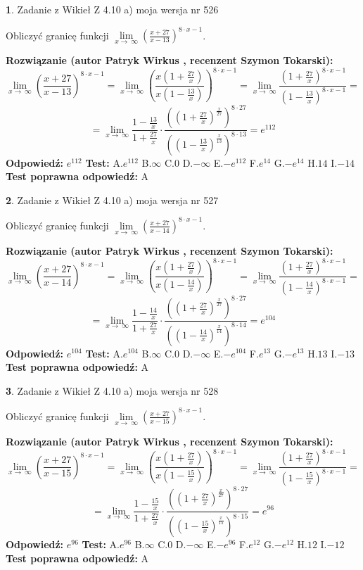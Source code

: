 \documentclass[12pt, a4paper]{article}
\theoremstyle{definition} %
\newtheorem{zad}{}
\newcommand{\zadStart}[1]{\begin{zad}#1\newline}
\newcommand{\zadStop}{\end{zad}}
\newcommand{\rozwStart}[2]{\noindent \textbf{Rozwiązanie (autor #1 , recenzent #2): }\newline}
\newcommand{\rozwStop}{\newline}
\newcommand{\odpStart}{\noindent \textbf{Odpowiedź:}\newline}
\newcommand{\odpStop}{\newline}
\newcommand{\testStart}{\noindent \textbf{Test:}\newline}
\newcommand{\testStop}{\newline}
\newcommand{\kluczStart}{\noindent \textbf{Test poprawna odpowiedź:}\newline}
\newcommand{\kluczStop}{\newline}
\begin{document}
\zadStart{Zadanie z Wikieł Z 4.10 a) moja wersja nr 526}

Obliczyć granicę funkcji  $\lim\limits_{x\to\ \infty}(\frac{x+27}{x-13})^{8\cdot x-1}$.
\zadStop
\rozwStart{Patryk Wirkus}{Szymon Tokarski}
$$\lim\limits_{x\to\ \infty}(\frac{x+27}{x-13})^{8\cdot x-1} = \lim\limits_{x\to\ \infty}(\frac{x(1+\frac{27}{x})}{x(1-\frac{13}{x})})^{8\cdot x-1}=\lim\limits_{x\to\ \infty}\frac{(1+\frac{27}{x})^{8\cdot x-1}}{(1-\frac{13}{x})^{8\cdot x-1}}=$$
$$=\lim\limits_{x\to\ \infty}\frac{1-\frac{13}{x}}{1+\frac{27}{x}}\cdot\frac{((1+\frac{27}{x})^{\frac{x}{27}})^{8\cdot27}}{((1-\frac{13}{x})^{\frac{x}{13}})^{8\cdot13}}=e^{112}$$
\rozwStop
\odpStart
$e^{112}$
\odpStop
\testStart
A.$e^{112}$ B.$\infty$ C.$0$ D.$-\infty$ E.$-e^{112}$
F.$e^{14}$ G.$-e^{14}$
H.$14$
I.$-14$
\testStop
\kluczStart
A
\kluczStop



\zadStart{Zadanie z Wikieł Z 4.10 a) moja wersja nr 527}

Obliczyć granicę funkcji  $\lim\limits_{x\to\ \infty}(\frac{x+27}{x-14})^{8\cdot x-1}$.
\zadStop
\rozwStart{Patryk Wirkus}{Szymon Tokarski}
$$\lim\limits_{x\to\ \infty}(\frac{x+27}{x-14})^{8\cdot x-1} = \lim\limits_{x\to\ \infty}(\frac{x(1+\frac{27}{x})}{x(1-\frac{14}{x})})^{8\cdot x-1}=\lim\limits_{x\to\ \infty}\frac{(1+\frac{27}{x})^{8\cdot x-1}}{(1-\frac{14}{x})^{8\cdot x-1}}=$$
$$=\lim\limits_{x\to\ \infty}\frac{1-\frac{14}{x}}{1+\frac{27}{x}}\cdot\frac{((1+\frac{27}{x})^{\frac{x}{27}})^{8\cdot27}}{((1-\frac{14}{x})^{\frac{x}{14}})^{8\cdot14}}=e^{104}$$
\rozwStop
\odpStart
$e^{104}$
\odpStop
\testStart
A.$e^{104}$ B.$\infty$ C.$0$ D.$-\infty$ E.$-e^{104}$
F.$e^{13}$ G.$-e^{13}$
H.$13$
I.$-13$
\testStop
\kluczStart
A
\kluczStop



\zadStart{Zadanie z Wikieł Z 4.10 a) moja wersja nr 528}

Obliczyć granicę funkcji  $\lim\limits_{x\to\ \infty}(\frac{x+27}{x-15})^{8\cdot x-1}$.
\zadStop
\rozwStart{Patryk Wirkus}{Szymon Tokarski}
$$\lim\limits_{x\to\ \infty}(\frac{x+27}{x-15})^{8\cdot x-1} = \lim\limits_{x\to\ \infty}(\frac{x(1+\frac{27}{x})}{x(1-\frac{15}{x})})^{8\cdot x-1}=\lim\limits_{x\to\ \infty}\frac{(1+\frac{27}{x})^{8\cdot x-1}}{(1-\frac{15}{x})^{8\cdot x-1}}=$$
$$=\lim\limits_{x\to\ \infty}\frac{1-\frac{15}{x}}{1+\frac{27}{x}}\cdot\frac{((1+\frac{27}{x})^{\frac{x}{27}})^{8\cdot27}}{((1-\frac{15}{x})^{\frac{x}{15}})^{8\cdot15}}=e^{96}$$
\rozwStop
\odpStart
$e^{96}$
\odpStop
\testStart
A.$e^{96}$ B.$\infty$ C.$0$ D.$-\infty$ E.$-e^{96}$
F.$e^{12}$ G.$-e^{12}$
H.$12$
I.$-12$
\testStop
\kluczStart
A
\kluczStop
\end{document}

